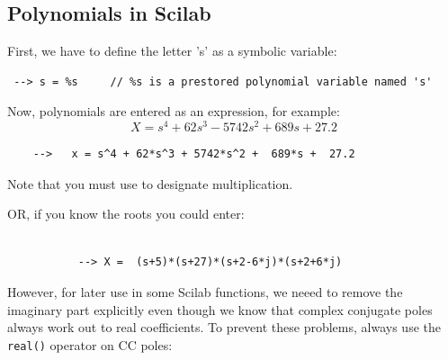 



\subsection{Polynomials in Scilab}\label{ScilabPolynomials}

First, we have to define the letter 's' as a symbolic variable:

\begin{verbatim}
 --> s = %s     // %s is a prestored polynomial variable named 's'
\end{verbatim}




%
 Now, polynomials are entered as an expression, for example:
%
\[
 X = s^4 + 62s^3 - 5742s^2 + 689s + 27.2
\]

\begin{verbatim}
    -->   x = s^4 + 62*s^3 + 5742*s^2 +  689*s +  27.2
\end{verbatim}


 Note that you must use {\tt *} to designate multiplication.



OR, if you know the roots you could enter:

\begin{verbatim}

           --> X =  (s+5)*(s+27)*(s+2-6*j)*(s+2+6*j)
\end{verbatim}

However, for later use in some Scilab functions, we neeed to remove the imaginary part explicitly even though we know that complex conjugate poles always work out to real coefficients.   To prevent these problems, always use the {\tt real()} operator on CC poles:

